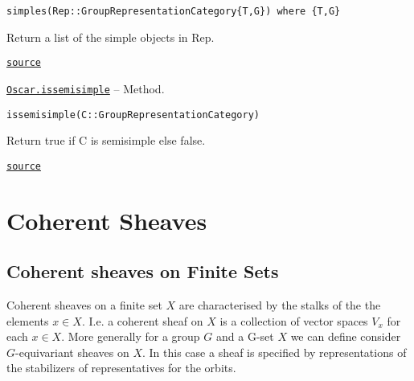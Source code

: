 \documentclass{memoir}
\begin{document}
\begin{adjustwidth}{2em}{0pt}


\begin{verbatim}
simples(Rep::GroupRepresentationCategory{T,G}) where {T,G}
\end{verbatim}

Return a list of the simple objects in Rep.



\href{https://github.com/FabianMaeurer/JuCat.jl/blob/367390e2d003deec2ababa73caeab405e934bb35/src/structures/Representations/GroupRepresentations.jl#L378-L382}{\texttt{source}}


\end{adjustwidth}
\hypertarget{4399047499095318369}{} 
\hyperlink{4399047499095318369}{\texttt{Oscar.issemisimple}}  -- {Method.}

\begin{adjustwidth}{2em}{0pt}


\begin{verbatim}
issemisimple(C::GroupRepresentationCategory)
\end{verbatim}

Return true if C is semisimple else false.



\href{https://github.com/FabianMaeurer/JuCat.jl/blob/367390e2d003deec2ababa73caeab405e934bb35/src/structures/Representations/GroupRepresentations.jl#L80-L84}{\texttt{source}}


\end{adjustwidth}

\chapter{Coherent Sheaves}




\hypertarget{5947772561377446122}{}


\section{Coherent sheaves on Finite Sets}



Coherent sheaves on a finite set \(X\) are characterised by the stalks of the the elements \(x \in X\). I.e. a coherent sheaf on \(X\) is a collection of vector spaces \(V_x\) for each \(x\in X\). More generally for a group \(G\) and a G-set \(X\) we can define consider \(G\)-equivariant sheaves on \(X\). In this case a sheaf is specified by representations of the stabilizers of representatives for the orbits.
\end{document}
